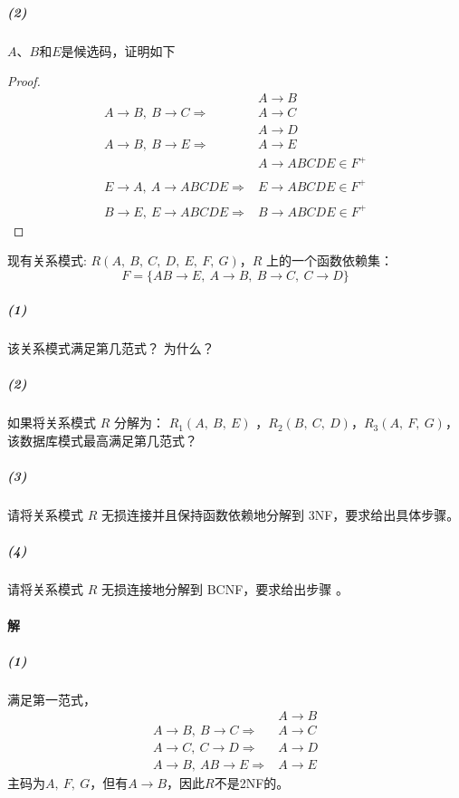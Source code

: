 \documentclass{article}
\makeatletter
\renewcommand{\section}{\@startsection{section}{1}{0mm}
                                {-5ex plus -.5ex minus -.2ex}
                                {3ex plus .2ex}
                                {\normalfont\large\bfseries}}
\makeatother
\begin{document}
\subparagraph{(2)}
$A$、$B$和$E$是候选码，证明如下
\begin{proof}
    \begin{align*}
                                                          & A \rightarrow B             \\
        A \rightarrow B,\ B \rightarrow C \Rightarrow     & A \rightarrow C             \\
                                                          & A \rightarrow D             \\
        A \rightarrow B,\ B \rightarrow E \Rightarrow     & A \rightarrow E             \\
                                                          & A \rightarrow ABCDE \in F^+ \\
                                                          &                             \\
        E \rightarrow A,\ A \rightarrow ABCDE \Rightarrow & E \rightarrow ABCDE \in F^+ \\
                                                          &                             \\
        B \rightarrow E,\ E \rightarrow ABCDE \Rightarrow & B \rightarrow ABCDE \in F^+
    \end{align*}
\end{proof}


\section{现有关系模式: $R(A,\ B,\ C,\ D,\ E,\ F,\ G)$，$R$ 上的一个函数依赖集：$$F = \{AB \rightarrow E,\ A \rightarrow B,\ B \rightarrow C,\ C \rightarrow D \}$$}
\subparagraph{(1)} 该关系模式满足第几范式？ 为什么？
\subparagraph{(2)} 如果将关系模式 $R$ 分解为： $R_1(A,\ B,\ E)$ ，$R_2(B,\ C,\ D)$，$R_3(A,\ F,\ G)$，该数据库模式最高满足第几范式？
\subparagraph{(3)} 请将关系模式 $R$ 无损连接并且保持函数依赖地分解到 3NF，要求给出具体步骤。
\subparagraph{(4)} 请将关系模式 $R$ 无损连接地分解到 BCNF，要求给出步骤 。

\paragraph{解}
\subparagraph{(1)}
满足第一范式，
\begin{align*}
                                                   & A \rightarrow B \\
    A \rightarrow B,\ B \rightarrow C \Rightarrow  & A \rightarrow C \\
    A \rightarrow C,\ C \rightarrow D \Rightarrow  & A \rightarrow D \\
    A \rightarrow B,\ AB \rightarrow E \Rightarrow & A \rightarrow E
\end{align*}
主码为$A,\ F,\  G$，但有$A \rightarrow B$，因此$R$不是2NF的。
\end{document}
